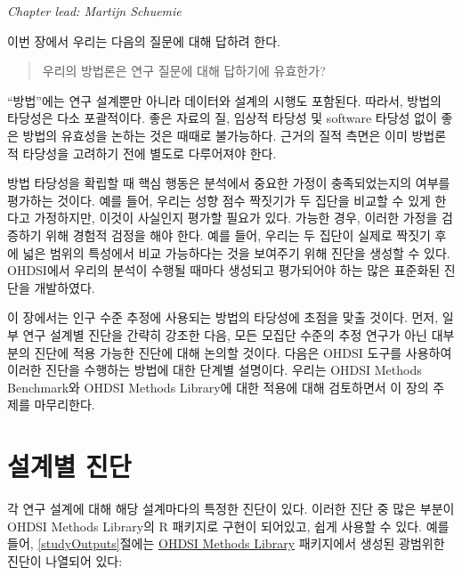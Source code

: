 \documentclass[11pt]{book}
\theoremstyle{definition}
\theoremstyle{definition}
\theoremstyle{definition}
\theoremstyle{remark}
\begin{document}

\emph{Chapter lead: Martijn Schuemie}

이번 장에서 우리는 다음의 질문에 대해 답하려 한다.

\begin{quote}
우리의 방법론은 연구 질문에 대해 답하기에 유효한가?
\end{quote}

``방법''에는 연구 설계뿐만 아니라 데이터와 설계의 시행도 포함된다.
따라서, 방법의 타당성은 다소 포괄적이다. 좋은 자료의 질, 임상적 타당성
및 software 타당성 없이 좋은 방법의 유효성을 논하는 것은 때때로
불가능하다. 근거의 질적 측면은 이미 방법론적 타당성을 고려하기 전에
별도로 다루어져야 한다.

방법 타당성을 확립할 때 핵심 행동은 분석에서 중요한 가정이
충족되었는지의 여부를 평가하는 것이다. 예를 들어, 우리는 성향 점수
짝짓기가 두 집단을 비교할 수 있게 한다고 가정하지만, 이것이 사실인지
평가할 필요가 있다. 가능한 경우, 이러한 가정을 검증하기 위해 경험적
검정을 해야 한다. 예를 들어, 우리는 두 집단이 실제로 짝짓기 후에 넓은
범위의 특성에서 비교 가능하다는 것을 보여주기 위해 진단을 생성할 수
있다. OHDSI에서 우리의 분석이 수행될 때마다 생성되고 평가되어야 하는
많은 표준화된 진단을 개발하였다.

이 장에서는 인구 수준 추정에 사용되는 방법의 타당성에 초점을 맞출
것이다. 먼저, 일부 연구 설계별 진단을 간략히 강조한 다음, 모든 모집단
수준의 추정 연구가 아닌 대부분의 진단에 적용 가능한 진단에 대해 논의할
것이다. 다음은 OHDSI 도구를 사용하여 이러한 진단을 수행하는 방법에 대한
단계별 설명이다. 우리는 OHDSI Methods Benchmark와 OHDSI Methods
Library에 대한 적용에 대해 검토하면서 이 장의 주제를 마무리한다.

\section{설계별 진단}\label{-}


각 연구 설계에 대해 해당 설계마다의 특정한 진단이 있다. 이러한 진단 중
많은 부분이 OHDSI Methods Library의 R 패키지로 구현이 되어있고, 쉽게
사용할 수 있다. 예를 들어, \ref{studyOutputs}절에는
\href{https://ohdsi.github.io/MethodsLibrary/}{OHDSI Methods Library}
패키지에서 생성된 광범위한 진단이 나열되어 있다:
\end{document}
